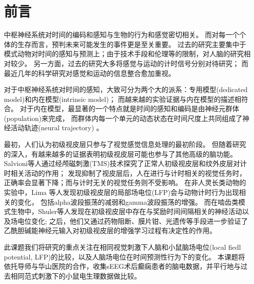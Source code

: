 \chapter{前言}

中枢神经系统对时间的编码和感知与生物的行为和感觉密切相关。
而对每一个个体的生存而言，预判未来可能发生的事件更是至关重要。
过去的研究主要集中于模式动物对时间的感知与预测上；由于技术手段和伦理等的限制，对人脑的研究相对较少。
另一方面，过去的研究大多将感觉与运动的计时信号分别对待研究；
而最近几年的科学研究对感觉和运动的信息整合愈加重视。

对于中枢神经系统对时间的感知，大致可分为两个大的派系：专用模型(dedicated model)和内在模型(intrinsic model)；
而越来越的实验证据与内在模型的描述相符合\cite{paton_neural_2018}。
对于内在模型，最显著的一个特点就是时间的感知和编码是由神经元群体(population)来完成，
而群体内每一个单元的动态状态在时间尺度上共同组成了神经活动轨迹(neural trajectory)
\cite{buonomano_state-dependent_2009,remington_dynamical_2018}。

最初，人们认为初级视皮层只参与了视觉感觉信息处理的最初阶段。
但随着研究的深入，有越来越多的证据表明初级视皮层可能也参与了其他高级的脑功能。
Salvioni等人通过经颅磁刺激(TMS)技术探究了正常人初级视皮层和纹外皮层对计时相关活动的作用；
发现抑制了视皮层后，人在进行与计时相关的视觉任务时，正确率会显著下降；而与计时无关的视觉任务则不受影响\cite{salvioni_how_2013}。
在非人灵长类动物的实验中，Lima 等人发现初级视皮层的局部场电位(LFP)会与动物计时行为出现相关的变化，
包括alpha波段振荡的减弱和gamma波段振荡的增强\cite{lima_gamma_2011}。
而在啮齿类模式生物中，Shuler等人发现在初级视皮层中存在与奖励时间间隔相关的神经活动以及场电位变化\cite{chubykin_cholinergic_2013,shuler_reward_2006,zold_theta_2015};
之后，他们又通过药物阻断、膜片钳、光遗传等手段进一步验证了乙酰胆碱能神经元输入对初级视皮层的增强学习过程有决定性的作用\cite{chubykin_cholinergic_2013,liu_selective_2015,namboodiri_visually_2015}。


此课题我们将研究的重点关注在相同视觉刺激下人脑和小鼠脑场电位(local fiedl potential, LFP)的比较，以及人脑场电位在时间预测性行为下的变化。
本课题将依托导师与华山医院的合作，收集sEEG术后癫痫患者的脑电数据，并平行地与过去相同范式刺激下的小鼠电生理数据做比较。
